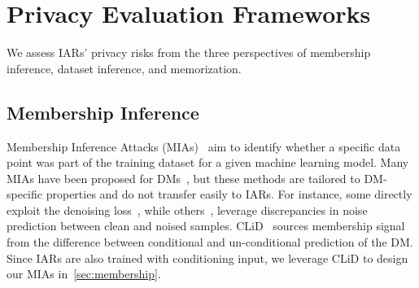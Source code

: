 \section{Privacy Evaluation Frameworks}
\label{sec:priv_eval}


We assess IARs' privacy risks from the three perspectives of membership inference, dataset inference, and memorization. 

\subsection{Membership Inference}
Membership Inference Attacks (MIAs)~\citep{shokri2017membershipinference} aim to identify whether a specific data point was part of the training dataset for a given machine learning model. 
Many MIAs have been proposed for DMs~\citep{dm2_duan23bSecMI,zhai2024clid,carlini2023extracting,kong2023efficient}, but these methods are tailored to DM-specific properties and do not transfer easily to IARs. For instance, some directly exploit the denoising loss~\citep{carlini2023extracting}, while others~\citep{kong2023efficient}, leverage discrepancies in noise prediction between clean and noised samples. CLiD~\citep{zhai2024clid} sources membership signal from the difference between conditional and un-conditional prediction of the DM. Since IARs are also trained with conditioning input, we leverage CLiD to design our MIAs in~\cref{sec:membership}.



